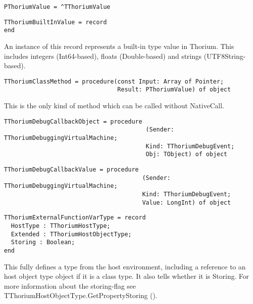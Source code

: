 \begin{verbatim}
PThoriumValue = ^TThoriumValue
\end{verbatim}
\label{thoriumcorepkg:thorium:pthoriumvalue}



\begin{verbatim}
TThoriumBuiltInValue = record
end

\end{verbatim}
\label{thoriumcorepkg:thorium:tthoriumbuiltinvalue}
An instance of this record represents a built-in type value in Thorium. This includes integers (Int64-based), floats (Double-based) and strings (UTF8String-based).


\begin{verbatim}
TThoriumClassMethod = procedure(const Input: Array of Pointer;
                                Result: PThoriumValue) of object
\end{verbatim}
\label{thoriumcorepkg:thorium:tthoriumclassmethod}
This is the only kind of method which can be called without NativeCall.


\begin{verbatim}
TThoriumDebugCallbackObject = procedure
                                        (Sender: TThoriumDebuggingVirtualMachine;
                                        Kind: TThoriumDebugEvent;
                                        Obj: TObject) of object
\end{verbatim}
\label{thoriumcorepkg:thorium:tthoriumdebugcallbackobject}



\begin{verbatim}
TThoriumDebugCallbackValue = procedure
                                       (Sender: TThoriumDebuggingVirtualMachine;
                                       Kind: TThoriumDebugEvent;
                                       Value: LongInt) of object
\end{verbatim}
\label{thoriumcorepkg:thorium:tthoriumdebugcallbackvalue}



\begin{verbatim}
TThoriumExternalFunctionVarType = record
  HostType : TThoriumHostType;
  Extended : TThoriumHostObjectType;
  Storing : Boolean;
end

\end{verbatim}
\label{thoriumcorepkg:thorium:tthoriumexternalfunctionvartype}
This fully defines a type from the host environment, including a reference to an host object type object if it is a class type. It also tells whether it is Storing. For more information about the storing-flag see TThoriumHostObjectType.GetPropertyStoring (\pageref{thoriumcorepkg:thorium:tthoriumhostobjecttype:getpropertystoring}).


